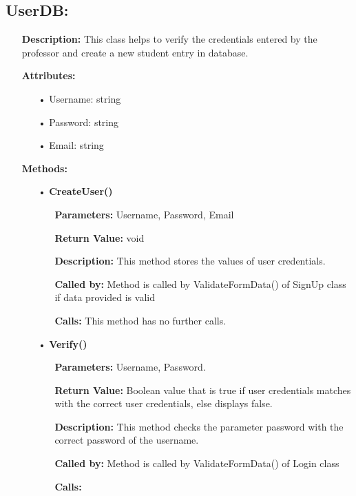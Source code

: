 \documentclass{scrreprt}
\begin{document}
\subsection{UserDB:}
\begin{enumerate}
\item[] \textbf{Description:} This class helps to verify the credentials entered by the professor and create a new student entry in database.
\item[] \textbf{Attributes:}
\begin{itemize}
\item [•] Username: string
\item [•] Password: string
\item [•] Email: string
\end{itemize}
\item[] \textbf{Methods:}
\begin{itemize}
\item [•] \textbf{CreateUser()}
\begin{itemize}
\item [] \textbf{Parameters:} Username, Password, Email  
\item [] \textbf{Return Value:} void 
\item [] \textbf{Description:} This method stores the values of user credentials.
\item [] \textbf{Called by:} Method is called by ValidateFormData() of SignUp class if data provided is valid
\item [] \textbf{Calls:} This method has no further calls.
\end{itemize}

\item [•] \textbf{Verify()}
\begin{itemize}
\item [] \textbf{Parameters:} Username, Password.
\item [] \textbf{Return Value:} Boolean value that is true if user credentials matches with the correct user credentials, else displays false.
\item [] \textbf{Description:} This method checks the parameter password with the correct password of the username.
\item [] \textbf{Called by:} Method is called by ValidateFormData() of Login class
\item [] \textbf{Calls:}
\end{itemize}
\end{itemize}
\end{enumerate}
\end{document}
